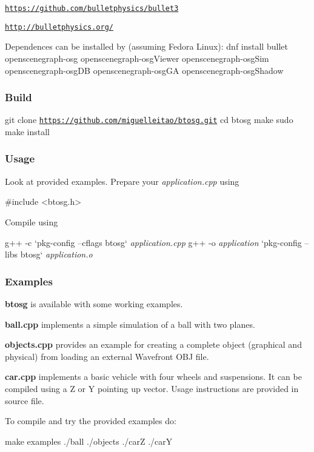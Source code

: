 \begin{DoxyItemize}
\item \href{https://github.com/bulletphysics/bullet3}{\tt https\+://github.\+com/bulletphysics/bullet3}
\item \href{http://bulletphysics.org/}{\tt http\+://bulletphysics.\+org/}
\end{DoxyItemize}

Dependences can be installed by (assuming Fedora Linux)\+: dnf install bullet openscenegraph-\/osg openscenegraph-\/osg\+Viewer openscenegraph-\/osg\+Sim openscenegraph-\/osg\+DB openscenegraph-\/osg\+GA openscenegraph-\/osg\+Shadow

\subsubsection*{Build}

git clone \href{https://github.com/miguelleitao/btosg.git}{\tt https\+://github.\+com/miguelleitao/btosg.\+git} cd btosg make sudo make install

\subsubsection*{Usage}

Look at provided examples. Prepare your {\itshape application.\+cpp} using \begin{DoxyVerb}#include <btosg.h>
\end{DoxyVerb}


Compile using 
\begin{DoxyPre}
g++ -c `pkg-config --cflags btosg` {\itshape application.cpp}
g++ -o {\itshape application} `pkg-config --libs btosg` {\itshape application.o}
\end{DoxyPre}
 \subsubsection*{Examples}

{\bfseries btosg} is available with some working examples.
\begin{DoxyItemize}
\item {\bfseries ball.\+cpp} implements a simple simulation of a ball with two planes.
\item {\bfseries objects.\+cpp} provides an example for creating a complete object (graphical and physical) from loading an external Wavefront O\+BJ file.
\item {\bfseries car.\+cpp} implements a basic vehicle with four wheels and suspensions. It can be compiled using a Z or Y pointing up vector. Usage instructions are provided in source file.
\end{DoxyItemize}

To compile and try the provided examples do\+: \begin{DoxyVerb}make examples 
./ball
./objects
./carZ
./carY\end{DoxyVerb}
 